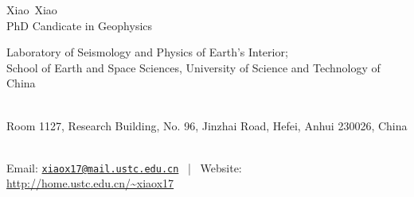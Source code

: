 \documentclass[11pt, a4paper]{article}
\makeatletter
\newcommand{\FirstName}{Xiao}
\newcommand{\LastName}{Xiao}
\newcommand{\MyName}{\FirstName\ \LastName}
\newcommand{\MyRole}{PhD Candicate in Geophysics}
\newcommand{\Email}{xiaox17@mail.ustc.edu.cn}
\newcommand{\Website}{http://home.ustc.edu.cn/~xiaox17}
\newcommand{\Affiliation}{
    Laboratory of Seismology and Physics of Earth's Interior; \\
    School of Earth and Space Sciences,
    University of Science and Technology of China
}
\newcommand{\Address}{
    Room 1127, Research Building, No. 96, Jinzhai Road, Hefei, Anhui 230026, China
}
\newcommand{\makefield}[2]{\makebox[1.5em]{\color{MarkerColour!80!black}#1} #2}
\makeatother
\begin{document}
\thispagestyle{empty}

\begin{center}
    {\fontsize{36pt}{0}\selectfont \MyName}
    \\[0.5cm]
    {\fontsize{16pt}{0}\selectfont \MyRole}
    \\[0.3cm]
    {\fontsize{10pt}{0}\selectfont
        \Affiliation
        \\[0.2cm]
        \Address
        \\[0.08cm]
        Email: \href{mailto:\Email}{\texttt{\Email}}
        \, | \,
        Website: \url{\Website}
    }
\end{center}








%

%
\end{document}
